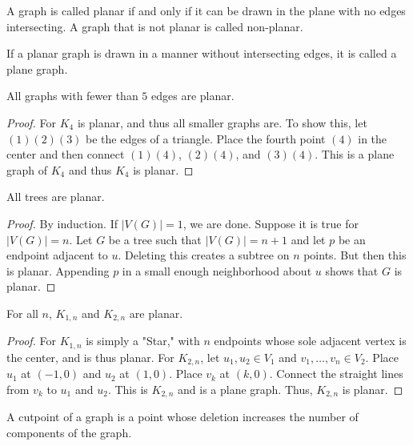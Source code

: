         \begin{definition}
        A graph is called planar if and only if it can be drawn in the plane with no edges intersecting. A graph that is not planar is called non-planar.
        \end{definition}
        \begin{definition}
        If a planar graph is drawn in a manner without intersecting edges, it is called a plane graph.
        \end{definition}
        \begin{theorem}
        All graphs with fewer than $5$ edges are planar.
        \end{theorem}
        \begin{proof}
        For $K_4$ is planar, and thus all smaller graphs are. To show this, let $(1)(2)(3)$ be the edges of a triangle. Place the fourth point $(4)$ in the center and then connect $(1)(4)$, $(2)(4)$, and $(3)(4)$. This is a plane graph of $K_4$ and thus $K_4$ is planar.
        \end{proof}
        \begin{theorem}
        All trees are planar.
        \end{theorem}
        \begin{proof}
        By induction. If $|V(G)| = 1$, we are done. Suppose it is true for $|V(G)| = n$. Let $G$ be a tree such that $|V(G)| = n+1$ and let $p$ be an endpoint adjacent to $u$. Deleting this creates a subtree on $n$ points. But then this is planar. Appending $p$ in a small enough neighborhood about $u$ shows that $G$ is planar.
        \end{proof}
        \begin{theorem}
        For all $n$, $K_{1,n}$ and $K_{2,n}$ are planar.
        \end{theorem}
        \begin{proof}
        For $K_{1,n}$ is simply a "Star," with $n$ endpoints whose sole adjacent vertex is the center, and is thus planar. For $K_{2,n}$, let $u_1,u_2 \in V_1$ and $v_1,\hdots, v_n \in V_2$. Place $u_1$ at $(-1,0)$ and $u_2$ at $(1,0)$. Place $v_k$ at $(k,0)$. Connect the straight lines from $v_k$ to $u_1$ and $u_2$. This is $K_{2,n}$ and is a plane graph. Thus, $K_{2,n}$ is planar.
        \end{proof}
        \begin{definition}
        A cutpoint of a graph is a point whose deletion increases the number of components of the graph.
        \end{definition}
